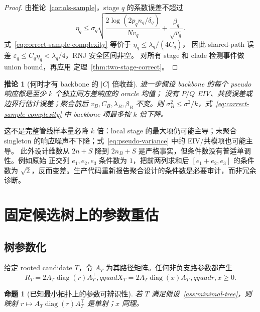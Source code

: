 \documentclass[UTF8,11pt]{ctexart}
\newtheorem{proposition}[definition]{命题}
\newtheorem{corollary}[definition]{推论}
\newcommand{\diag}{\operatorname{diag}}
\begin{document}
\begin{proof}
由推论~\ref{cor:ols-sample}，stage $q$ 的系数误差不超过
\begin{equation*}
 \eta_q\le\sigma_q\sqrt{\frac{2\log(2p_qn_q/\delta_q)}{Nv_q}}
 +\frac{\beta_q}{\sqrt{v_q}}.
\end{equation*}
式~\eqref{eq:correct-sample-complexity} 等价于 $\eta_q\le\lambda_q/(4C_q)$，
因此 shared-path 误差 $\varepsilon_q\le C_q\eta_q<\lambda_q/4$，RNJ 安全区间非空。
对所有 stage 和 clade 检测事件做 union bound，再应用
定理~\ref{thm:two-stage-correct}。
\end{proof}

\begin{corollary}[何时才有 backbone 的 $|C|$ 倍收益]
\label{cor:k-gain}
进一步假设 backbone 的每个 pseudo 响应都是至少 $k$ 个独立同方差响应的 oracle 均值；
没有 $P/Q$ EIV、共模误差或边界行估计误差；聚合前后 $v_B,C_B,\lambda_B,\beta_B$
不变。则 $\sigma_B^2\le\sigma^2/k$，式~\eqref{eq:correct-sample-complexity} 中
\emph{backbone 项}最多按 $k$ 倍下降。
\end{corollary}

这不是完整管线样本量必降 $k$ 倍：local stage 的最大项仍可能主导；未聚合 singleton
的响应噪声不下降；式~\eqref{eq:pseudo-variance} 中的 EIV/共模项也可能主导。
此外设计维数从 $2n+S$ 降到 $2n_B+S$ 是严格事实，但条件数没有普适单调性。例如原始
正交列 $e_1,e_2,e_3$ 条件数为 $1$，把前两列求和后 $[e_1+e_2,e_3]$ 的条件数为
$\sqrt2$，反而变差。生产代码重新报告聚合设计的条件数是必要审计，而非冗余诊断。

\section{固定候选树上的参数重估}

\subsection{树参数化}

给定 rooted candidate $T$，令 $A_T$ 为其路径矩阵。任何非负支路参数都产生
\begin{equation}
 R_T=2A_T\diag(r)A_T^\top,qquad
 X_T=2A_T\diag(x)A_T^\top,qquad r,x\ge0.
 \label{eq:fixed-tree-parameterization}
\end{equation}

\begin{proposition}[已知最小拓扑上的参数可辨识性]
\label{prop:fixed-tree-identifiability}
若 $T$ 满足假设~\ref{ass:minimal-tree}，则映射
$r\mapsto A_T\diag(r)A_T^\top$ 是单射；$x$ 同理。
\end{proposition}
\end{document}
